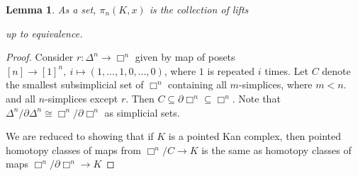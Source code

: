 \documentclass{article}
\theoremstyle{definition}
\theoremstyle{remark}
\theoremstyle{plain}
\newtheorem{lem}[defn]{Lemma}
\begin{document}
\begin{lem}
    As a set, $\pi_n(K,x)$ is the collection of lifts
    \begin{center}
    \end{center}
    up to equivalence.
\end{lem}
\begin{proof}
    Consider $r:\Delta^n\to\Box^n$ given by map of posets $[n]\to[1]^n,\ i\mapsto (1,...,1,0,...,0)$, where $1$ is repeated $i$ times. Let $C$ denote the smallest subsimplicial set of $\Box^n$ containing all $m$-simplices, where $m<n$. and all $n$-simplices except $r$. Then $C\subseteq\partial\Box^n\subseteq\Box^n$. Note that $\Delta^n/\partial\Delta^n\cong\Box^n/\partial\Box^n$ as simplicial sets.

    We are reduced to showing that if $K$ is a pointed Kan complex, then pointed homotopy classes of maps from $\Box^n/C\to K$ is the same as homotopy classes of maps $\Box^n/\partial\Box^n\to K$
\end{proof}
\end{document}
